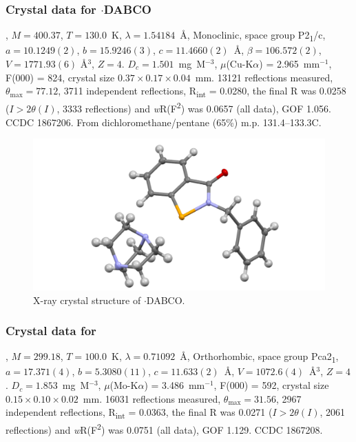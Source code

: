 \begin{refsection}
    \subsubsection{Crystal data for \texorpdfstring{$ \cdot $DABCO}{C20H23N3OSe}}
    , $M=400.37$, $T=130.0$~K, $\lambda=1.54184$~\AA, Monoclinic, space group P2\textsubscript{1}/c, $a = 10.1249(2)$, $b = 15.9246(3)$, $c = 11.4660(2)$~\AA, $\beta = 106.572(2)$\degree, $V = 1771.93(6)$ \AA$^{3}$, $Z = 4$.
    $D_{c} = 1.501$~mg~M$^{-3}$, $\mu$(Cu-K$\alpha$) = 2.965~mm$^{-1}$, F(000) = 824, crystal size $0.37 \times 0.17 \times 0.04$~mm.
    13121 reflections measured, $\theta_{\max} = 77.12$\degree, 3711 independent reflections, R\textsubscript{int} = 0.0280, the final R was 0.0258 ($I > 2\theta(I)$, 3333 reflections) and \textit{w}R(F\textsuperscript{2}) was 0.0657 (all data), GOF 1.056.
    CCDC 1867206.
    From dichloromethane/pentane (65\%) m.p. 131.4--133.3\degree{}C.
    
    \begin{figure}
      \includegraphics[width=0.6\linewidth]{Figures/ebs-bn-dabco-xtal.pdf}
      \caption{X-ray crystal structure of \texorpdfstring{$ \cdot $DABCO}{C20H23N3OSe}.}
    \end{figure}
    
    \subsubsection{Crystal data for \texorpdfstring{}{C14H8N2OSe}}
    , $M=299.18$, $T=100.0$~K, $\lambda=0.71092$~\AA, Orthorhombic, space group Pca2\textsubscript{1}, $a = 17.371(4)$, $b = 5.3080(11)$, $c = 11.633(2)$~\AA, $V = 1072.6(4)$~\AA$^{3}$, $Z = 4$.
    $D_{c}= 1.853$~mg~M$^{-3}$, $\mu$(Mo-K$\alpha$) = 3.486~mm$^{-1}$, F(000) = 592, crystal size $0.15 \times 0.10 \times 0.02$~mm.
    16031 reflections measured, $\theta_{\max}=31.56$\degree, 2967 independent reflections, R\textsubscript{int} = 0.0363, the final R was 0.0271 ($I > 2\theta(I)$, 2061 reflections) and \textit{w}R(F\textsuperscript{2}) was 0.0751 (all data), GOF 1.129.
    CCDC 1867208.
    

\end{refsection}
